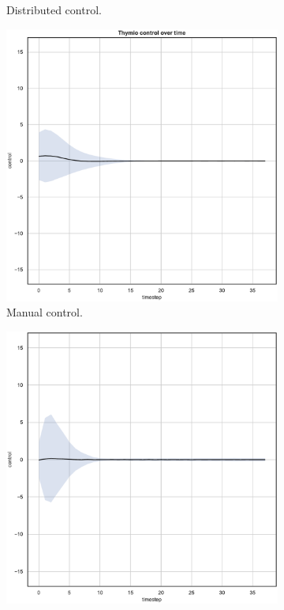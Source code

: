 \begin{figure}[!htb]
\begin{center}
\begin{subfigure}[h]{0.35\textwidth}
			\caption{Distributed control.}
		\end{subfigure}
	\end{center}
	\begin{center}
		\begin{subfigure}[h]{0.35\textwidth}			
			\includegraphics[width=\textwidth]{contents/images/net-d1/control-overtime-manual}%
			\caption{Manual control.}
		\end{subfigure}
		\hspace{1cm}
		\begin{subfigure}[h]{0.35\textwidth}
			\includegraphics[width=\textwidth]{contents/images/net-c1/control-overtime-learned_communication}

\end{subfigure}
\end{center}
\end{figure}
